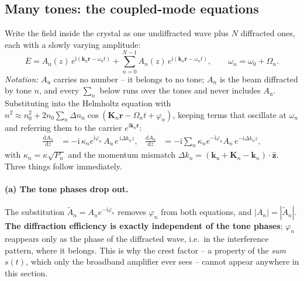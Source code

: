 \documentclass[11pt,a4paper]{article}
\newcommand{\Au}{\ensuremath{A_\mathrm{u}}}
\begin{document}
\subsection{Many tones: the coupled-mode equations}

Write the field inside the crystal as one undiffracted wave plus $N$
diffracted ones, each with a slowly varying amplitude:
\begin{equation}
  E = \Au(z)\,e^{\mathrm{i}(\mathbf k_\mathrm{u}\mathbf r-\omega_0 t)}
    + \sum_{n=0}^{N-1} A_n(z)\,e^{\mathrm{i}(\mathbf k_n\mathbf r-\omega_n t)} ,
  \qquad \omega_n = \omega_0+\Omega_n .
  \label{eq:ansatz}
\end{equation}
\emph{Notation:} \Au{} carries no number -- it belongs to no tone; $A_n$ is
the beam diffracted by tone $n$, and every $\sum_n$ below runs over the tones
and never includes \Au. Substituting into the Helmholtz equation with
$n^2 \approx n_0^2 + 2n_0\sum_n \Delta n_n\cos(\mathbf K_n\mathbf r
-\Omega_n t+\varphi_n)$, keeping terms that oscillate at $\omega_n$ and
referring them to the carrier $e^{\mathrm{i}\mathbf k_n\mathbf r}$:
\begin{align}
  \frac{\mathrm{d}A_n}{\mathrm{d}z}
    &= -\mathrm{i}\,\kappa_n e^{\mathrm{i}\varphi_n}\,\Au\,
       e^{\,\mathrm{i}\Delta k_n z} ,
  &\frac{\mathrm{d}\Au}{\mathrm{d}z}
    &= -\mathrm{i}\sum_n \kappa_n e^{-\mathrm{i}\varphi_n} A_n\,
       e^{-\mathrm{i}\Delta k_n z} ,
  \label{eq:coupledgen}
\end{align}
with $\kappa_n = \kappa\sqrt{P_n}$ and the momentum mismatch
$\Delta k_n = (\mathbf k_\mathrm{u}+\mathbf K_n-\mathbf k_n)\cdot\hat{\mathbf z}$.
Three things follow immediately.

\paragraph{(a) The tone phases drop out.} The substitution
$\tilde A_n = A_n e^{-\mathrm{i}\varphi_n}$ removes $\varphi_n$ from both
equations, and $|A_n| = |\tilde A_n|$. \textbf{The diffraction efficiency is
exactly independent of the tone phases}; $\varphi_n$ reappears only as the
phase of the diffracted wave, i.e.\ in the interference pattern, where it
belongs. This is why the crest factor -- a property of the \emph{sum} $s(t)$,
which only the broadband amplifier ever sees -- cannot appear anywhere in
this section.
\end{document}

